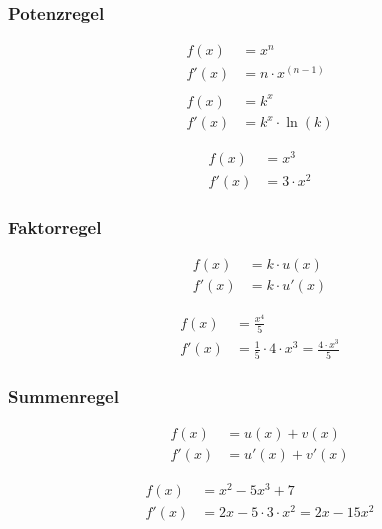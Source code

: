 \documentclass[11pt, openany]{book}
\begin{document}
\subsubsection{Potenzregel}
\noindent\begin{minipage}{\boxwidth}
\begin{tcolorbox}
\begin{align*}
    f(x) &= x^n \\
    f'(x) &= n\cdot x^{(n-1)} \\
    \\
    f(x) &= k^x \\
    f'(x) &= k^x \cdot \ln(k)
\end{align*}
\end{tcolorbox}
\end{minipage}
\hfill
\begin{minipage}{\examplewidth}
\begin{align*}
    f(x) &= x^3 \\
    f'(x) &= 3\cdot x^2
\end{align*}
\end{minipage}

\subsubsection{Faktorregel}
\noindent\begin{minipage}{\boxwidth}
\begin{tcolorbox}
\begin{align*}
    f(x) &= k\cdot u(x) \\
    f'(x) &= k\cdot u'(x)
\end{align*}
\end{tcolorbox}
\end{minipage}
\hfill
\begin{minipage}{\examplewidth}
\begin{align*}
    f(x) &= \frac{x^4}{5} \\
    f'(x) &= \frac{1}{5} \cdot 4\cdot x^3 = \frac{4\cdot x^3}{5}
\end{align*}
\end{minipage}

\subsubsection{Summenregel}
\noindent\begin{minipage}{\boxwidth}
\begin{tcolorbox}
\begin{align*}
    f(x) &= u(x) + v(x) \\
    f'(x) &= u'(x) + v'(x)
\end{align*}
\end{tcolorbox}
\end{minipage}
\hfill
\begin{minipage}{\examplewidth}
\begin{align*}
f(x) &= x^2 - 5x^3 + 7 \\
f'(x) &= 2x - 5\cdot 3\cdot x^2 = 2x - 15x^2
\end{align*}
\end{minipage}
\end{document}
